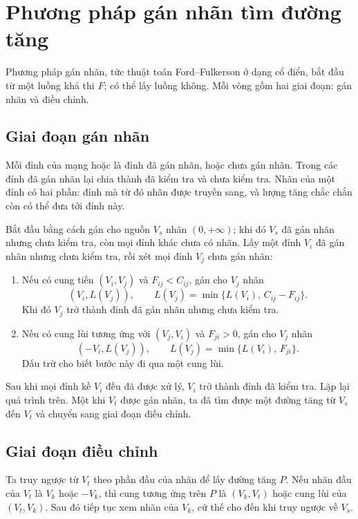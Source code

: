 \documentclass[11pt]{article}
\begin{document}
\section{Phương pháp gán nhãn tìm đường tăng}

Phương pháp gán nhãn, tức thuật toán Ford--Fulkerson ở dạng cổ điển, bắt đầu
từ một luồng khả thi $F$; có thể lấy luồng không. Mỗi vòng gồm hai giai đoạn:
gán nhãn và điều chỉnh.

\subsection{Giai đoạn gán nhãn}

Mỗi đỉnh của mạng hoặc là đỉnh đã gán nhãn, hoặc chưa gán nhãn. Trong các đỉnh
đã gán nhãn lại chia thành đã kiểm tra và chưa kiểm tra. Nhãn của một đỉnh có
hai phần: đỉnh mà từ đó nhãn được truyền sang, và lượng tăng chắc chắn còn có
thể đưa tới đỉnh này.

Bắt đầu bằng cách gán cho nguồn $V_s$ nhãn $(0,+\infty)$; khi đó $V_s$ đã gán
nhãn nhưng chưa kiểm tra, còn mọi đỉnh khác chưa có nhãn. Lấy một đỉnh
$V_i$ đã gán nhãn nhưng chưa kiểm tra, rồi xét mọi đỉnh $V_j$ chưa gán nhãn:

\begin{enumerate}
  \item Nếu có cung tiến $(V_i,V_j)$ và $F_{ij}<C_{ij}$, gán cho $V_j$ nhãn
  \[
    (V_i,L(V_j)),\qquad
    L(V_j)=\min\{L(V_i),\,C_{ij}-F_{ij}\}.
  \]
  Khi đó $V_j$ trở thành đỉnh đã gán nhãn nhưng chưa kiểm tra.

  \item Nếu có cung lùi tương ứng với $(V_j,V_i)$ và $F_{ji}>0$, gán cho
  $V_j$ nhãn
  \[
    (-V_i,L(V_j)),\qquad
    L(V_j)=\min\{L(V_i),\,F_{ji}\}.
  \]
  Dấu trừ cho biết bước này đi qua một cung lùi.
\end{enumerate}

Sau khi mọi đỉnh kề $V_i$ đều đã được xử lý, $V_i$ trở thành đỉnh đã kiểm tra.
Lặp lại quá trình trên. Một khi $V_t$ được gán nhãn, ta đã tìm được một đường
tăng từ $V_s$ đến $V_t$ và chuyển sang giai đoạn điều chỉnh.

\subsection{Giai đoạn điều chỉnh}

Ta truy ngược từ $V_t$ theo phần đầu của nhãn để lấy đường tăng $P$. Nếu nhãn
đầu của $V_t$ là $V_k$ hoặc $-V_k$, thì cung tương ứng trên $P$ là
$(V_k,V_t)$ hoặc cung lùi của $(V_t,V_k)$. Sau đó tiếp tục xem nhãn của
$V_k$, cứ thế cho đến khi truy ngược về $V_s$.
\end{document}
